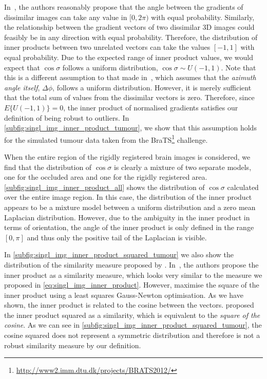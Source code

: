 In~\cite{tzimiropoulos2012subspace,tzimiropoulos2010robust},
the authors reasonably propose that the angle between the
gradients of dissimilar images can take any value in $[0, 2\pi)$ with equal
probability. Similarly, the relationship between the gradient vectors of two
dissimilar 3D images could feasibly be in any direction with equal probability.
Therefore, the distribution of inner products between two unrelated vectors can
take the values $[-1, 1]$ with equal probability. Due to the expected range of
inner product values, we would expect that $\cos{\sigma}$ follows a uniform
distribution, $\cos{\sigma} \sim U(-1, 1)$. Note that this is a different
assumption to that made in~\cite{tzimiropoulos2011robust}, which assumes that the
\textit{azimuth angle itself}, $\Delta \phi$, follows a uniform distribution.
However, it is merely sufficient that the total sum of values from the
dissimilar vectors is zero. Therefore, since $E\{U(-1, 1)\} = 0$, the inner
product of normalised gradients satisfies our definition of being robust to
outliers. In \cref{subfig:singl_img_inner_product_tumour}, we show that this
assumption holds for the simulated tumour data taken from the 
BraTS\footnote{\url{http://www2.imm.dtu.dk/projects/BRATS2012/}} challenge.

When the entire region of the rigidly registered brain images is considered, we
find that the distribution of $\cos{\sigma}$ is clearly a mixture of two
separate models, one for the occluded area and one for the rigidly registered
area. \cref{subfig:singl_img_inner_product_all} shows the distribution of
$\cos{\sigma}$ calculated over the entire image region. In this case, the
distribution of the inner product appears to be a mixture model between a
uniform distribution and a zero mean Laplacian distribution. However, due to the
ambiguity in the inner product in terms of orientation, the angle of the inner
product is only defined in the range $[0, \pi]$ and thus only the positive tail
of the Laplacian is visible.

In \cref{subfig:singl_img_inner_product_squared_tumour} we also show the
distribution of the similarity measure proposed by \citet{haber2006intensity}.
In~\cite{haber2006intensity}, the authors propose the inner product as a
similarity measure, which looks very similar to the measure we proposed in
\cref{eq:singl_img_inner_product}. 
However, \citet{haber2006intensity} maximise the square of the
inner product using a least squares Gauss-Newton optimisation. As we have shown,
the inner product is related to the cosine between the vectors.
\citet{haber2006intensity} proposed the inner product squared as
a similarity, which is equivalent to the \textit{square of the cosine}. As we
can see in \cref{subfig:singl_img_inner_product_squared_tumour}, the cosine squared
does not represent a symmetric distribution and therefore is not a robust
similarity measure by our definition.
